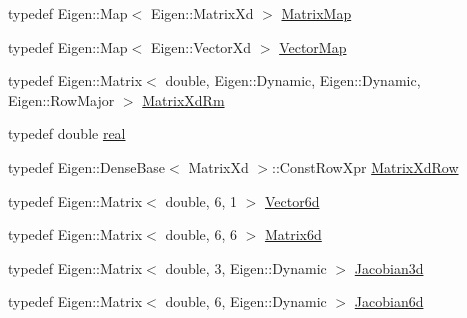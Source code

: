 \begin{DoxyCompactItemize}
\item 
typedef Eigen\+::\+Map$<$ Eigen\+::\+Matrix\+Xd $>$ \hyperlink{group__solver_ga2890a4739c18700eeea0645d1e41b5f7}{Matrix\+Map}
\item 
typedef Eigen\+::\+Map$<$ Eigen\+::\+Vector\+Xd $>$ \hyperlink{group__solver_ga48f83fdb8879c800a49682c6f9c3f2e5}{Vector\+Map}
\item 
typedef Eigen\+::\+Matrix$<$ double, Eigen\+::\+Dynamic, Eigen\+::\+Dynamic, Eigen\+::\+Row\+Major $>$ \hyperlink{group__solver_ga70eb87299c2fc1db3c4aac05df67d889}{Matrix\+Xd\+Rm}
\item 
typedef double \hyperlink{namespaceocra_af4478308ca113669e67d72f9a3050469}{real}
\item 
typedef Eigen\+::\+Dense\+Base$<$ Matrix\+Xd $>$\+::Const\+Row\+Xpr \hyperlink{namespaceocra_a608bf0522317ed1df3bbfc6a5753bc01}{Matrix\+Xd\+Row}
\item 
typedef Eigen\+::\+Matrix$<$ double, 6, 1 $>$ \hyperlink{namespaceocra_a72fe7d6cf8411efbfc475a3a78209867}{Vector6d}
\item 
typedef Eigen\+::\+Matrix$<$ double, 6, 6 $>$ \hyperlink{namespaceocra_a4ee053c9fed8722df857e4f8f4d6d334}{Matrix6d}
\item 
typedef Eigen\+::\+Matrix$<$ double, 3, Eigen\+::\+Dynamic $>$ \hyperlink{namespaceocra_a9d83c179b8710177bed2bbba41a12447}{Jacobian3d}
\item 
typedef Eigen\+::\+Matrix$<$ double, 6, Eigen\+::\+Dynamic $>$ \hyperlink{namespaceocra_ac73b015f9f7cb0c252c4d5c4800f559a}{Jacobian6d}
\end{DoxyCompactItemize}
